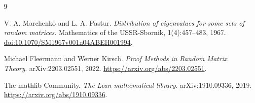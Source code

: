 \documentclass[11pt]{article}
\theoremstyle{remark}
\begin{document}
\begin{thebibliography}{9}
\raggedright
{}
V. A. Marchenko and L. A. Pastur.
\emph{Distribution of eigenvalues for some sets of random matrices}.
Mathematics of the USSR-Sbornik, 1(4):457--483, 1967.
\href{https://doi.org/10.1070/SM1967v001n04ABEH001994}{doi:10.1070/SM1967v001n04ABEH001994}.

Michael Fleermann and Werner Kirsch.
\emph{Proof Methods in Random Matrix Theory}.
arXiv:2203.02551, 2022.
\url{https://arxiv.org/abs/2203.02551}.

The mathlib Community.
\emph{The Lean mathematical library}.
arXiv:1910.09336, 2019.
\url{https://arxiv.org/abs/1910.09336}.
\end{thebibliography}
\end{document}
